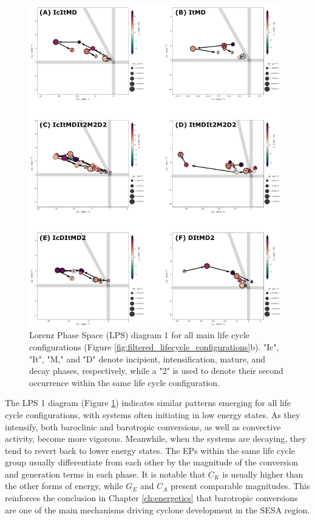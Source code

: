 \begin{figure}[!htbp]
\centering
\includegraphics[width=\textwidth]{figs_6/lps_mixed_clusters_all_life_cycles.pdf}
\caption[LPS 1 - Clusters - All Life Cycle Configurations]{Lorenz Phase Space (LPS) diagram 1 for all main life cycle configurations (Figure \ref{fig:filtered_lifecycle_configurations}b). "Ic", "It", "M," and "D" denote incipient, intensification, mature, and decay phases, respectively, while a "2" is used to denote their second occurrence within the same life cycle configuration.}
\label{fig:lps_mixed_clusters_all_life_cycles}
\end{figure}

The LPS 1 diagram (Figure \ref{fig:lps_mixed_clusters_all_life_cycles}) indicates similar patterns emerging for all life cycle configurations, with systems often initiating in low energy states. As they intensify, both baroclinic and barotropic conversions, as well as convective activity, become more vigorous. Meanwhile, when the systems are decaying, they tend to revert back to lower energy states. The EPs within the same life cycle group usually differentiate from each other by the magnitude of the conversion and generation terms in each phase. It is notable that $C_K$ is usually higher than the other forms of energy, while $G_E$ and $C_A$ present comparable magnitudes. This reinforces the conclusion in Chapter \ref{ch:energetics} that barotropic conversions are one of the main mechanisms driving cyclone development in the SESA region.

